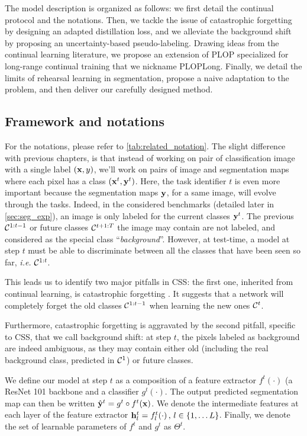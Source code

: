 The model description is organized as follows: we first detail the continual protocol and the
notations. Then, we tackle the issue of catastrophic forgetting by designing an adapted distillation
loss, and we alleviate the background shift by proposing an uncertainty-based pseudo-labeling. Drawing
ideas from the continual learning literature, we propose an extension of PLOP specialized for
long-range continual training that we nickname PLOPLong. Finally, we detail the limits of rehearsal
learning in segmentation, propose a naive adaptation to the problem, and then deliver our carefully
designed method.

\subsection{Framework and notations}\label{sec:seg_overview}

For the notations, please refer to \autoref{tab:related_notation}. The slight difference with
previous chapters, is that instead of working on pair of classification image with a single label $(\mathbf{x},
    y)$, we'll work on pairs of image and segmentation maps where each pixel has a class $(\mathbf{x}^t,
    \mathbf{y}^t)$. Here, the task identifier $t$ is even more important because the segmentation maps $\mathbf{y}$,
for a same image, will evolve through the tasks. Indeed, in the considered benchmarks (detailed
later in \autoref{sec:seg_exp}), an image is only labeled for the current classes $\mathbf{y}^t$. The
previous $\mathcal{C}^{1:t-1}$ or future classes $\mathcal{C}^{t+1:T}$ the image may contain are not labeled, and
considered as the special class ``\textit{background}''. However, at test-time, a model at step $t$
must be able to discriminate between all the classes that have been seen so far, \textit{i.e.}
$\mathcal{C}^{1:t}$.

This leads us to identify two major pitfalls in \ac{CSS}: the first one, inherited from continual
learning, is catastrophic forgetting \cite{robins1995catastrophicforgetting}. It suggests that a
network will completely forget the old classes $\mathcal{C}^{1:t-1}$ when learning the new ones $\mathcal{C}^t$.

Furthermore, catastrophic forgetting is aggravated by the second pitfall, specific to \ac{CSS}, that
we call background shift: at step $t$, the pixels labeled as background are indeed ambiguous, as
they may contain either old (including the real background class, predicted in $\mathcal{C}^{1}$) or future
classes.

We define our model at step $t$ as a composition of a feature extractor $f^t(\cdot)$ (a ResNet 101
\cite{he2016resnet} backbone and a classifier $g^t(\cdot)$. The output predicted segmentation map
can then be written $\hat{\mathbf{y}}^t = g^t \circ f^t(\mathbf{x})$. We denote the intermediate features at
each layer of the feature extractor $\mathbf{h}_l^t = f_l^t(\cdot)\,,\, l \in \{1, \dots L\}$. Finally, we denote the
set of learnable parameters of $f^t$ and $g^t$ as $\Theta^t$.


